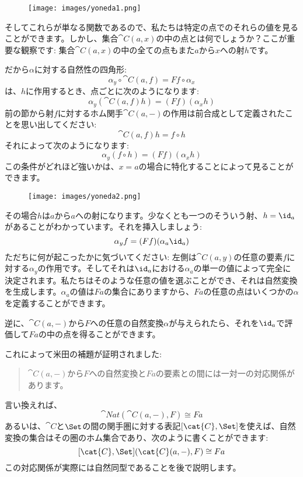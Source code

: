 \begin{figure}[H]
  \centering
  \texttt{[image: images/yoneda1.png]}
\end{figure}

\noindent
そしてこれらが単なる関数であるので、私たちは特定の点でのそれらの値を見ることができます。しかし、集合$\cat{C}(a, x)$の中の点とは何でしょうか？ここが重要な観察です: 集合$\cat{C}(a, x)$の中の全ての点もまた$a$から$x$への射$h$です。

だから$\alpha$に対する自然性の四角形: 
\[\alpha_y \circ \cat{C}(a, f) = F f \circ \alpha_x\]
は、$h$に作用するとき、点ごとに次のようになります: 
\[\alpha_y (\cat{C}(a, f) h) = (F f) (\alpha_x h)\]
前の節から射$f$に対するホム関手$\cat{C}(a,-)$の作用は前合成として定義されたことを思い出してください: 
\[\cat{C}(a, f) h = f \circ h\]
それによって次のようになります: 
\[\alpha_y (f \circ h) = (F f) (\alpha_x h)\]
この条件がどれほど強いかは、$x = a$の場合に特化することによって見ることができます。

\begin{figure}[H]
  \centering
  \texttt{[image: images/yoneda2.png]}
\end{figure}

\noindent
その場合$h$は$a$から$a$への射になります。少なくとも一つのそういう射、$h = \id_a$があることがわかっています。それを挿入しましょう: 
\[\alpha_y f = (F f) (\alpha_a \id_a)\]
ただちに何が起こったかに気づいてください: 左側は$\cat{C}(a, y)$の任意の要素$f$に対する$\alpha_y$の作用です。そしてそれは$\id_a$における$\alpha_a$の単一の値によって完全に決定されます。私たちはそのような任意の値を選ぶことができ、それは自然変換を生成します。$\alpha_a$の値は$F a$の集合にありますから、$F a$の任意の点はいくつかの$\alpha$を定義することができます。

逆に、$\cat{C}(a, -)$から$F$への任意の自然変換$\alpha$が与えられたら、それを$\id_a$で評価して$F a$の中の点を得ることができます。

これによって米田の補題が証明されました: 

\begin{quote}
  $\cat{C}(a, -)$から$F$への自然変換と$F a$の要素との間には一対一の対応関係があります。
\end{quote}
言い換えれば、
\[\cat{Nat}(\cat{C}(a, -), F) \cong F a\]
あるいは、$\cat{C}$と$\Set$の間の関手圏に対する表記$[\cat{C}, \Set]$を使えば、自然変換の集合はその圏のホム集合であり、次のように書くことができます: 
\[[\cat{C}, \Set](\cat{C}(a, -), F) \cong F a\]
この対応関係が実際には自然同型であることを後で説明します。

